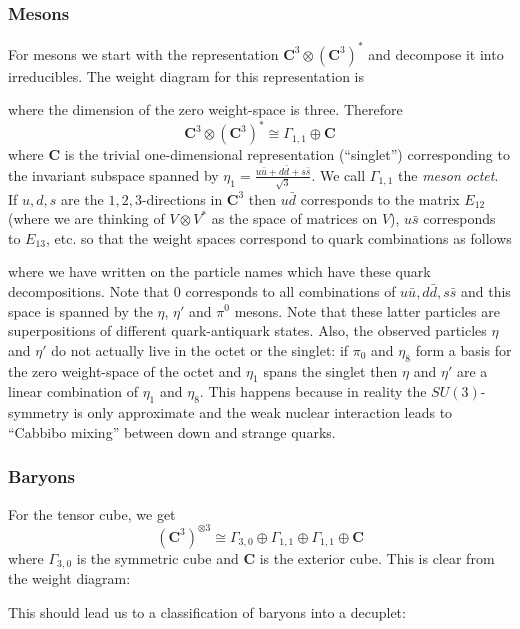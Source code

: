 \documentclass[12pt]{article}
\newcommand{\CC}{\mathbf{C}}
\theoremstyle{definition}
\theoremstyle{check}
\theoremstyle{remark}
\theoremstyle{TheoremNum}
\begin{document}
\subsubsection{Mesons}

For mesons we start with the representation $\CC^3\otimes(\CC^3)^*$ and decompose it into irreducibles. The weight diagram for this representation is

\slstdtensordual

where the dimension of the zero weight-space is three. Therefore
\[\CC^3\otimes(\CC^3)^*\cong\Gamma_{1,1}\oplus\CC\]
where $\CC$ is the trivial one-dimensional representation (``singlet'') corresponding to the invariant subspace spanned by $\eta_1=\frac{u\bar{u}+d\bar{d}+s\bar{s}}{\sqrt{3}}$. We call $\Gamma_{1,1}$ the {\em meson octet}. If $u,d,s$ are the $1,2,3$-directions in $\CC^3$ then $u\bar{d}$ corresponds to the matrix $E_{12}$ (where we are thinking of $V\otimes V^*$ as the space of matrices on $V$), $u\bar{s}$ corresponds to $E_{13}$, etc. so that the weight spaces correspond to quark combinations as follows

\meson

where we have written on the particle names which have these quark decompositions. Note that $0$ corresponds to all combinations of $u\bar{u},d\bar{d},s\bar{s}$ and this space is spanned by the $\eta$, $\eta'$ and $\pi^0$ mesons. Note that these latter particles are superpositions of different quark-antiquark states. Also, the observed particles $\eta$ and $\eta'$ do not actually live in the octet or the singlet: if $\pi_0$ and $\eta_8$ form a basis for the zero weight-space of the octet and $\eta_1$ spans the singlet then $\eta$ and $\eta'$ are a linear combination of $\eta_1$ and $\eta_8$. This happens because in reality the $SU(3)$-symmetry is only approximate and the weak nuclear interaction leads to ``Cabbibo mixing'' between down and strange quarks.

\subsubsection{Baryons}

For the tensor cube, we get
\[(\CC^3)^{\otimes 3}\cong\Gamma_{3,0}\oplus\Gamma_{1,1}\oplus\Gamma_{1,1}\oplus\CC\]
where $\Gamma_{3,0}$ is the symmetric cube and $\CC$ is the exterior cube. This is clear from the weight diagram:

\baryon

This should lead us to a classification of baryons into a decuplet:
\end{document}
